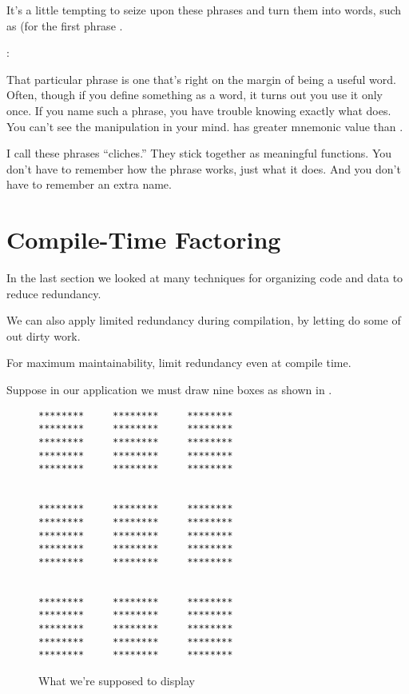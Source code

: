 It's a little tempting to seize upon these phrases and turn them into
words, such as (for the first phrase .

\begin{interview}
:

\begin{tfquot}
That particular phrase  is one that's right on
the margin of being a useful word. Often, though if you define
something as a word, it turns out you use it only once. If you name
such a phrase, you have trouble knowing exactly what 
does. You can't see the manipulation in your mind.  has greater mnemonic value than .
\end{tfquot}
\end{interview}
I call these phrases ``cliches.'' They stick together as meaningful
functions. You don't have to remember how the phrase works, just what
it does. And you don't have to remember an extra name.

\section{{Compile-Time Factoring}}

\noindent
In the last section we looked at many techniques for organizing code
and data to reduce redundancy.

We can also apply limited redundancy during compilation, by letting
\Forth{} do some of out dirty work.

\begin{tip}
For maximum maintainability, limit redundancy even at compile time.
\end{tip}
Suppose in our application we must draw nine boxes as shown in
.

\begin{figure*}[hhhh]
\caption{What we're supposed to display}
\begin{center}
\begin{BVerbatim}[baselinestretch=0.7]
********     ********     ********
********     ********     ********
********     ********     ********
********     ********     ********
********     ********     ********


********     ********     ********
********     ********     ********
********     ********     ********
********     ********     ********
********     ********     ********


********     ********     ********
********     ********     ********
********     ********     ********
********     ********     ********
********     ********     ********
\end{BVerbatim}
\end{center}
\end{figure*}

